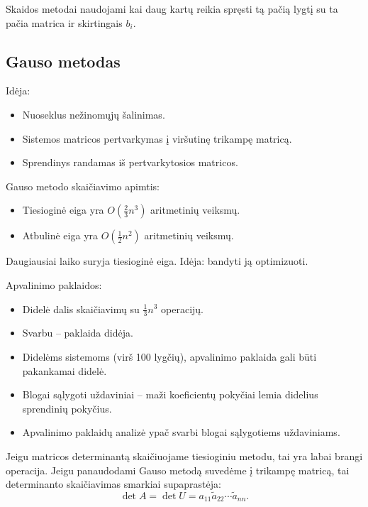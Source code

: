 
Skaidos metodai naudojami kai daug kartų reikia spręsti tą pačią
lygtį su ta pačia matrica ir skirtingais $b_{i}$.

\subsection{Gauso metodas}

\cite[60-62]{textbook}


Idėja:
\begin{itemize}
  \item Nuoseklus nežinomųjų šalinimas.
  \item Sistemos matricos pertvarkymas į viršutinę trikampę matricą.
  \item Sprendinys randamas iš pertvarkytosios matricos.
\end{itemize}


Gauso metodo skaičiavimo apimtis:
\begin{itemize}
  \item Tiesioginė eiga yra $O(\frac{2}{3}n^{3})$ aritmetinių veiksmų.
  \item Atbulinė eiga yra $O(\frac{1}{2}n^{2})$ aritmetinių veiksmų.
\end{itemize}
Daugiausiai laiko suryja tiesioginė eiga. Idėja: bandyti ją optimizuoti.




Apvalinimo paklaidos:
\begin{itemize}
  \item Didelė dalis skaičiavimų su $\frac{1}{3}n^{3}$ operacijų.
  \item Svarbu – paklaida didėja.
  \item Didelėms sistemoms (virš 100 lygčių), apvalinimo paklaida gali
    būti pakankamai didelė.
  \item Blogai sąlygoti uždaviniai – maži koeficientų pokyčiai
    lemia didelius sprendinių pokyčius.
  \item Apvalinimo paklaidų analizė ypač svarbi blogai sąlygotiems
    uždaviniams.
\end{itemize}


Jeigu matricos determinantą skaičiuojame tiesioginiu metodu, tai yra
labai brangi operacija. Jeigu panaudodami Gauso metodą suvedėme į
trikampę matricą, tai determinanto skaičiavimas smarkiai
supaprastėja:
\begin{equation*}
  \det A = \det U = a_{11} \tilde{a}_{22} \cdots \tilde{a}_{nn}.
\end{equation*}

